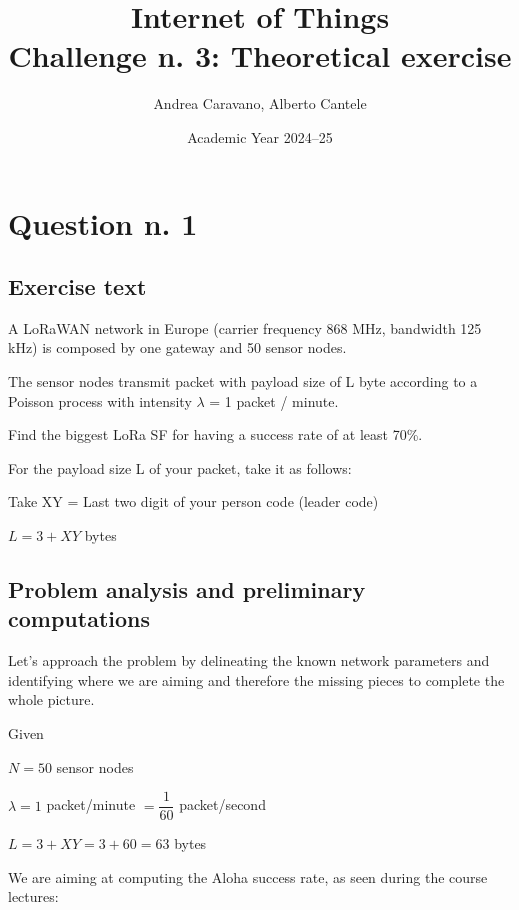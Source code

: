 \documentclass[a4paper,11pt]{article} %
\title{\textbf{Internet of Things}\\Challenge n. 3: Theoretical exercise}
\author{Andrea Caravano, Alberto Cantele}
\date{Academic Year 2024--25}
\begin{document}
    \maketitle

    \tableofcontents


    \section{Question n. 1}\label{sec:question-n.-1}

    \subsection{Exercise text}\label{subsec:exercise-text}
    A LoRaWAN network in Europe (carrier frequency 868 MHz, bandwidth 125 kHz) is composed by one gateway and 50 sensor nodes.

    The sensor nodes transmit packet with payload size of L byte according to a Poisson process with intensity $\lambda$ = 1 packet / minute.

    Find the biggest LoRa SF for having a success rate of at least 70\%.

    For the payload size L of your packet, take it as follows:

    Take XY = Last two digit of your person code (leader code)

    $L = 3 + XY$ bytes

    \subsection{Problem analysis and preliminary computations}\label{subsec:problem-analysis-and-preliminary-computations}
    Let's approach the problem by delineating the known network parameters and identifying where we are aiming and therefore the missing pieces to complete the whole picture.

    \bigskip

    Given

    \medskip

    $N = 50$ sensor nodes

    \smallskip

    $\lambda = 1$ packet/minute $= \dfrac{1}{60}$ packet/second

    \medskip

    $L = 3 + XY = 3 + 60 = 63$ bytes

    \medskip

    We are aiming at computing the Aloha success rate, as seen during the course lectures:
\end{document}
